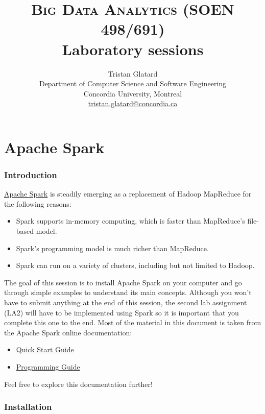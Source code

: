 \documentclass[11pt]{article}
\title{\textsc{Big Data Analytics (SOEN 498/691)} \\ Laboratory sessions}
\author{Tristan Glatard\\Department of Computer Science and Software Engineering\\Concordia University, Montreal\\\href{mailto:tristan.glatard@concordia.ca}{tristan.glatard@concordia.ca}}
\begin{document}
\maketitle

\newpage

\tableofcontents

\newpage

\part{Apache Spark}

\section{Introduction}

\href{http://spark.apache.org}{Apache Spark} is steadily emerging as a
replacement of Hadoop MapReduce for the following reasons:
\begin{itemize}
\item Spark supports in-memory computing, which is faster
  than MapReduce's file-based model.
\item Spark's programming model is much richer than
  MapReduce.
  \item Spark can run on a variety of clusters, including but not
    limited to Hadoop.
\end{itemize}

The goal of this session is to install Apache Spark on your computer
and go through simple examples to understand its main
concepts. Although you won't have to submit anything at the end of
this session, the second lab assignment (LA2) will have to be
implemented using Spark so it is important that you complete this one
to the end.  Most of the material in this document is taken from the
Apache Spark online documentation:
\begin{itemize}
\item  \href{http://spark.apache.org/docs/latest/quick-start.html}{Quick Start Guide}
\item \href{http://spark.apache.org/docs/latest/programming-guide.html}{Programming Guide}
\end{itemize}
Feel free to explore this documentation further!

\section{Installation}
\end{document}
